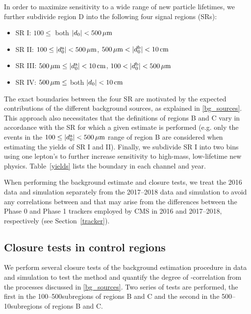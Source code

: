 In order to maximize sensitivity to a wide range of new particle lifetimes, we further subdivide region D into the following four signal regions (SRs):
\begin{itemize}
    \item SR I: $100 \leq $ both $\lvert d_0 \rvert<500\,\mu\text{m}$
    \item SR II: $100 \leq \lvert d^{\mathrm{a}}_0 \rvert<500\,\mu\text{m}$, $500\,\mu\text{m} < \lvert d^{\mathrm{b}}_0 \rvert<10\,\text{cm}$
    \item SR III: $500\,\mu\text{m} \leq \lvert d^{\mathrm{a}}_0 \rvert<10\,\text{cm}$, $100 < \lvert d^{\mathrm{b}}_0 \rvert<500\,\mu\text{m}$
    \item SR IV: $500\,\mu\text{m} \leq $ both $\lvert d_0 \rvert<10\,\text{cm}$
\end{itemize}
The exact boundaries between the four SR are motivated by the expected contributions of the different background sources, as explained in \ref{bg_sources}. This approach also necessitates that the definitions of regions B and C vary in accordance with the SR for which a given estimate is performed (e.g. only the events in the $100\leq\lvert d^{\mathrm{a}}_0 \rvert<500\,\mu\text{m}$ range of region B are considered when estimating the yields of SR I and II). Finally, we subdivide SR I into two bins using one lepton's \pt to further increase sensitivity to high-mass, low-lifetime new physics. Table~\ref{yields} lists the \pt boundary in each channel and year.

When performing the background estimate and closure tests, we treat the 2016 data and simulation separately from the 2017--2018 data and simulation to avoid any correlations between \ada and \adb that may arise from the differences between the Phase 0 and Phase 1 trackers employed by CMS in 2016 and 2017--2018, respectively (see Section~\ref{tracker}).

\subsection{Closure tests in control regions}
\label{cr_closure_tests}

We perform several closure tests of the background estimation procedure in data and simulation to test the method and quantify the degree of \ada-\adb correlation from the processes discussed in \ref{bg_sources}. Two series of tests are performed, the first in the 100--500\mum subregions of regions B and C and the second in the 500\mum--10\cm subregions of regions B and C.

